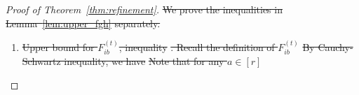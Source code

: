 \documentclass[lettersize,onecolumn,journal]{IEEEtran}
\theoremstyle{definition}
\theoremstyle{definition}
\newcommand{\of}[1]{\left(#1\right)}
\newcommand{\ang}[1]{\left\langle#1\right\rangle}
\providecommand{\DIFdeltex}[1]{{\protect\color{red}\sout{#1}}}                      %
\providecommand{\DIFdel}[1]{\texorpdfstring{\DIFdeltex{#1}}{}} %
\begin{document}
\begin{proof}[Proof of Theorem~\ref{thm:refinement}]
\DIFdel{We prove the inequalities in Lemma~\ref{lem:upper_fgh} separately.
}%
\begin{enumerate}%
\item%
\DIFdel{Upper bound for $F_{ib}^{(t)}$, inequality }%
\DIFdel{. Recall the definition of $F_{ib}^{(t)}$ 
    }%
\DIFdel{By Cauchy-Schwartz inequality, we have 
    }%
\DIFdel{Note that for any $a \in [r]$ 
    }%

\end{enumerate}
\end{proof}
\end{document}
